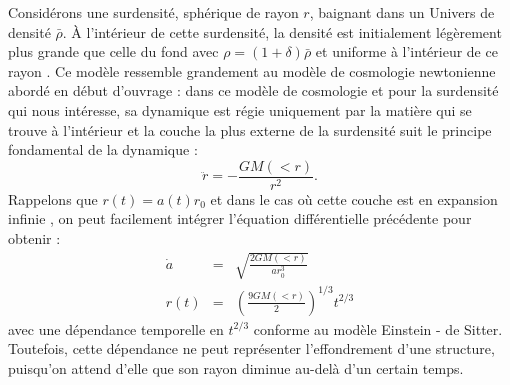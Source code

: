 Considérons une surdensité, sphérique de rayon $r$, baignant dans un Univers de densité $\bar \rho$. À l'intérieur de cette surdensité, la densité est initialement légèrement plus grande que celle du fond avec $\rho = (1+\delta) \bar \rho$ et uniforme à l'intérieur de ce rayon .  Ce modèle ressemble grandement au modèle de cosmologie newtonienne  abordé en début d'ouvrage : dans ce modèle de cosmologie et pour la surdensité qui nous intéresse, sa dynamique est régie uniquement par la matière qui se trouve à l'intérieur et la couche la plus externe de la surdensité suit le principe fondamental de la dynamique :
\begin{equation}
\ddot r = -\frac{GM(<r)}{r^2}.
\end{equation}
Rappelons que $r(t)=a(t)r_0$ et dans le cas où cette couche est en expansion infinie , on peut facilement intégrer l'équation différentielle précédente pour obtenir :
\begin{eqnarray}
\dot a &=&\sqrt{\frac{2GM(<r)}{ar_0^3}}\\
r(t)&=&\left(\frac{9GM(<r)}{2}\right)^{1/3} t^{2/3}
\end{eqnarray}
avec une dépendance temporelle en $t^{2/3}$ conforme au modèle Einstein - de Sitter. Toutefois, cette dépendance ne peut représenter l'effondrement d'une structure, puisqu'on attend d'elle que son rayon diminue au-delà d'un certain temps.

